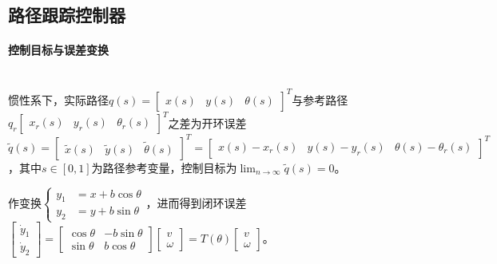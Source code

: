 \documentclass[
12pt, %
a4paper, 
oneside, %
headinclude,footinclude, %
]{scrartcl}
\begin{document}
\subsection[路径跟踪控制器]{路径跟踪控制器}
\paragraph{控制目标与误差变换}~\\

惯性系下，实际路径$ q(s) = \begin{bmatrix} x(s) & y(s) & \theta(s) \end{bmatrix}^T $与参考路径$ q_r \begin{bmatrix} x_r(s) & y_r(s) & \theta_r(s) \end{bmatrix}^T $之差为开环误差$ \tilde{q}(s) = \begin{bmatrix} \tilde{x}(s) & \tilde{y}(s) & \tilde{\theta}(s) \end{bmatrix}^T = \begin{bmatrix} x(s) - x_r(s) & y(s) - y_r(s) & \theta(s) - \theta_r(s) \end{bmatrix}^T $，其中$ s \in [0, 1] $为路径参考变量，控制目标为$ \lim_{n \to \infty} \tilde{q}(s) = 0 $。

作变换$ \begin{cases} y_1 &= x + b \cos\theta \\ y_2 &= y + b \sin\theta \end{cases} $，进而得到闭环误差$ \begin{bmatrix} \dot{y}_1 \\ \dot{y}_2 \end{bmatrix} = \begin{bmatrix} \cos\theta & -b \sin\theta \\ \sin\theta & b \cos\theta \end{bmatrix} \begin{bmatrix} v \\ \omega \end{bmatrix} = T(\theta) \begin{bmatrix} v \\ \omega \end{bmatrix} $。
\end{document}
